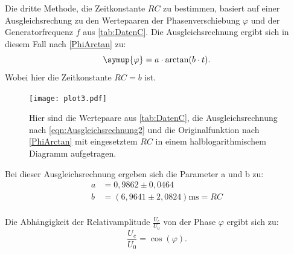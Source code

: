 Die dritte Methode, die Zeitkonstante $RC$ zu bestimmen, basiert auf einer Ausgleichsrechung zu den Wertepaaren der Phasenverschiebung $\varphi$ 
und der Generatorfrequenz $f$ aus \autoref{tab:DatenC}.
Die Ausgleichsrechnung ergibt sich in diesem Fall nach \eqref{PhiArctan} zu:
\begin{equation}
  \label{eqn:Ausgleichsrechnung2}
  \symup{\varphi} = a\cdot\arctan(b\cdot t).
\end{equation}
Wobei hier die Zeitkonstante $RC = b$ ist.
\begin{figure}[H]
  \centering
  \texttt{[image: plot3.pdf]}
  \caption{Hier sind die Wertepaare aus \autoref{tab:DatenC}, die Ausgleichsrechnung nach \eqref{eqn:Ausgleichsrechnung2} und die Originalfunktion nach \eqref{PhiArctan} mit eingesetztem $RC$ in einem halblogarithmischem Diagramm aufgetragen.}
  \label{fig:plot3}
\end{figure}
Bei dieser Ausgleichsrechnung ergeben sich die Parameter a und b zu:
\begin{align*}
  a &=0,9862\pm 0,0464 \\
  b &=(6,9641\pm 2,0824) \unit{\milli\second} = RC \\
\end{align*}

Die Abhängigkeit der Relativamplitude $\frac{U_c}{U_0}$ von der Phase $\varphi$ ergibt sich zu:
\begin{equation*}
  \frac{U_c}{U_0} = \cos\left(\varphi\right).
\end{equation*}

